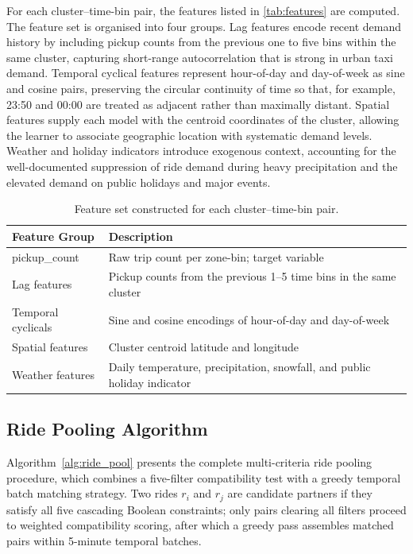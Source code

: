 \documentclass[a4paper,fleqn]{cas-dc}
\begin{document}
For each cluster--time-bin pair, the features listed in \autoref{tab:features} are computed.  The feature set is organised into four groups.  Lag features encode recent demand history by including pickup counts from the previous one to five bins within the same cluster, capturing short-range autocorrelation that is strong in urban taxi demand.  Temporal cyclical features represent hour-of-day and day-of-week as sine and cosine pairs, preserving the circular continuity of time so that, for example, 23:50 and 00:00 are treated as adjacent rather than maximally distant.  Spatial features supply each model with the centroid coordinates of the cluster, allowing the learner to associate geographic location with systematic demand levels.  Weather and holiday indicators introduce exogenous context, accounting for the well-documented suppression of ride demand during heavy precipitation and the elevated demand on public holidays and major events.

\begin{table}[t]
\centering
\caption{Feature set constructed for each cluster--time-bin pair.\label{tab:features}}
\begin{tabularx}{\linewidth}{>{\raggedright\arraybackslash}p{3.2cm} >{\raggedright\arraybackslash}X}
\toprule
\textbf{Feature Group} & \textbf{Description} \\
\toprule
pickup\_count & Raw trip count per zone-bin; target variable \\
Lag features & Pickup counts from the previous 1--5 time bins in the same cluster \\
Temporal cyclicals & Sine and cosine encodings of hour-of-day and day-of-week \\
Spatial features & Cluster centroid latitude and longitude \\
Weather features & Daily temperature, precipitation, snowfall, and public holiday indicator \\
\bottomrule
\end{tabularx}
\end{table}

\subsection{Ride Pooling Algorithm}
\label{sec:pooling}

Algorithm~\ref{alg:ride_pool} presents the complete multi-criteria ride pooling procedure, which combines a five-filter compatibility test with a greedy temporal batch matching strategy.  Two rides $r_i$ and $r_j$ are candidate partners if they satisfy all five cascading Boolean constraints; only pairs clearing all filters proceed to weighted compatibility scoring, after which a greedy pass assembles matched pairs within 5-minute temporal batches.
\end{document}
